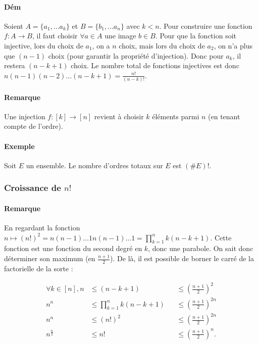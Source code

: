 \documentclass{article}
\begin{document}
			\paragraph{Dém} Soient $A = \{a_1, \ldots a_k\}$ et $B = \{b_1, \ldots a_n\}$ avec $k < n$. Pour construire une fonction $f : A \to B$, il faut
			choisir $\forall a \in A$ une image $b \in B$. Pour que la fonction soit injective, lors du choix de $a_1$, on a $n$ choix, mais lors du choix de $a_2$,
			on n'a plus que $(n-1)$ choix (pour garantir la propriété d'injection). Donc pour $a_k$, il restera $(n-k+1)$ choix. Le nombre total de fonctions injectives
			est donc $n(n-1)(n-2)\ldots(n-k+1) = \frac {n!}{(n-k)!}$.

			\paragraph{Remarque} Une injection $f : [k] \to [n]$ revient à choisir $k$ éléments parmi $n$ (en tenant compte de l'ordre).

			\paragraph{Exemple} Soit $E$ un ensemble. Le nombre d'ordres totaux sur $E$ est $(\#E)!$.

			\subsubsection{Croissance de $n!$}

			\paragraph{Remarque} En regardant la fonction $n \mapsto (n!)^2 = n(n-1)\ldots 1n(n-1)\ldots 1 = \prod_{k=1}^nk(n-k+1)$.
			Cette fonction est une fonction du second degré en $k$, donc une parabole. On sait donc déterminer son maximum (en $\frac {n+1}2$). De là, il est possible
			de borner le carré de la factorielle de la sorte :

			\[\begin{aligned}
				\forall k \in [n], n &\leq (n-k+1) &&\leq \left(\frac {n+1}2\right)^2 \\
								   n^n &\leq \prod_{k=1}^nk(n-k+1) &&\leq \left(\frac {n+1}2\right)^{2n} \\
								   n^n &\leq (n!)^2 &&\leq \left(\frac {n+1}2\right)^{2n} \\
								   n^{\frac n2} &\leq n! &&\leq \left(\frac {n+1}2\right)^n.
			\end{aligned}\]
\end{document}

